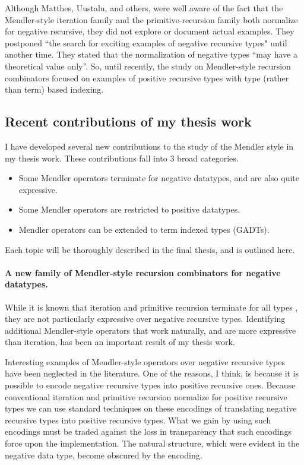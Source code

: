 Although Matthes, Uustalu, and others, were well aware of the fact that
the Mendler-style iteration family and the primitive-recursion family both
normalize for negative recursive, they did not explore or document actual
examples. They postponed ``the search for exciting examples of negative
recursive types" until another time. They stated that the normalization
of negative types ``may have a theoretical value
only''\cite{UusVen99}. So, until recently, the study on Mendler-style recursion
combinators focused on examples of positive recursive types with type (rather than term) based indexing.

\subsection{Recent contributions of my thesis work}
I have developed several new contributions to the study of the Mendler style
in my thesis work. These contributions fall into 3 broad categories.
\begin{itemize}
\item Some Mendler operators terminate for negative datatypes, and are also quite expressive.
\item Some Mendler operators are restricted to positive datatypes.
\item Mendler operators can be extended to term indexed types (GADTs).
\end{itemize}
Each topic will be thoroughly described in the final thesis, and is outlined here.


\paragraph{A new family of Mendler-style recursion combinators for negative datatypes.}

While it is known that iteration and primitive recursion terminate for all types
\cite{AbeMatUus05,AbeMat04}, they are not particularly expressive over negative
recursive types. Identifying additional Mendler-style operators that work
naturally, and are more expressive than iteration, has been an important result
of my thesis work.

Interesting examples of Mendler-style operators over negative recursive types
have been neglected in the literature. One of the reasons, I think, is because
it is possible to encode negative recursive types into positive recursive ones. Because conventional iteration and primitive recursion normalize for
positive recursive types we can use standard techniques on these encodings
of translating negative recursive types into positive recursive types.
What we gain by using such encodings must be traded against the loss in
transparency that such encodings force upon the implementation. The natural
structure, which were evident in the negative data type, become obscured by
the encoding.


